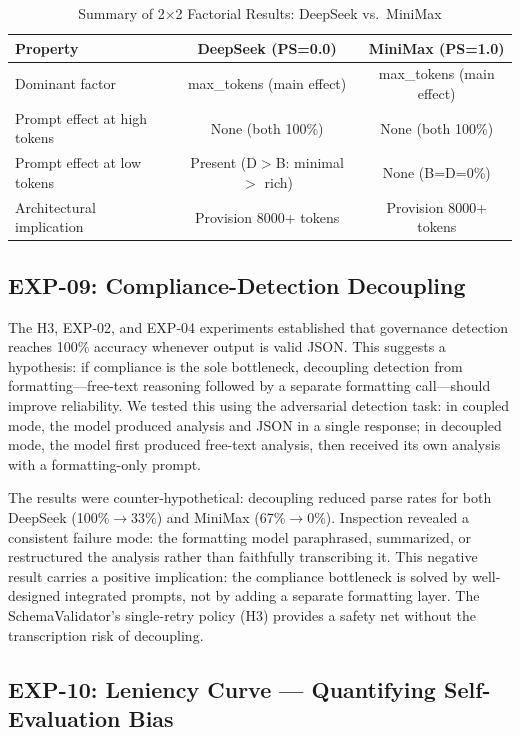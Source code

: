 \documentclass[11pt,a4paper]{article}
\begin{document}
\begin{table}[htbp]\centering\caption{Summary of 2$\times$2 Factorial Results: DeepSeek vs.\ MiniMax}\small
\begin{tabular}{lcc}\toprule\textbf{Property} & \textbf{DeepSeek (PS=0.0)} & \textbf{MiniMax (PS=1.0)}\\\midrule
Dominant factor & max\_tokens (main effect) & max\_tokens (main effect)\\
Prompt effect at high tokens & None (both 100\%) & None (both 100\%)\\
Prompt effect at low tokens & Present (D$>$B: minimal $>$ rich) & None (B=D=0\%)\\
Architectural implication & Provision 8000+ tokens & Provision 8000+ tokens\\\bottomrule
\end{tabular}
\end{table}

\subsection{EXP-09: Compliance-Detection Decoupling}

The H3, EXP-02, and EXP-04 experiments established that governance detection reaches 100\% accuracy whenever output is valid JSON. This suggests a hypothesis: if compliance is the sole bottleneck, decoupling detection from formatting---free-text reasoning followed by a separate formatting call---should improve reliability. We tested this using the adversarial detection task: in coupled mode, the model produced analysis and JSON in a single response; in decoupled mode, the model first produced free-text analysis, then received its own analysis with a formatting-only prompt.

The results were counter-hypothetical: decoupling reduced parse rates for both DeepSeek (100\%$\rightarrow$33\%) and MiniMax (67\%$\rightarrow$0\%). Inspection revealed a consistent failure mode: the formatting model paraphrased, summarized, or restructured the analysis rather than faithfully transcribing it. This negative result carries a positive implication: the compliance bottleneck is solved by well-designed integrated prompts, not by adding a separate formatting layer. The SchemaValidator's single-retry policy (H3) provides a safety net without the transcription risk of decoupling.

\subsection{EXP-10: Leniency Curve --- Quantifying Self-Evaluation Bias}
\end{document}

